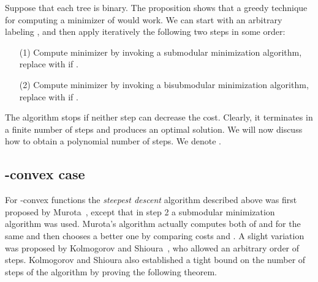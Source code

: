 \documentclass[11pt,onecolumn]{article}
\begin{document}
Suppose that each tree  is binary.
The proposition shows that a greedy technique for computing a minimizer of  would work. We can start with an arbitrary labeling ,
and then apply iteratively the following two steps in some order:
\begin{itemize}
\item[(1)] Compute minimizer  by invoking a submodular minimization algorithm, replace  with  if .
\item[(2)] Compute minimizer  by invoking a bisubmodular minimization algorithm, replace  with  if . 
\end{itemize}
The algorithm stops if neither step can decrease the cost. Clearly, it terminates in a finite number of steps and produces an optimal solution.
We will now discuss how to obtain a polynomial number of steps. We denote .

\subsection{-convex case}
For -convex functions the {\em steepest descent} algorithm described above was first proposed by Murota~\cite{Murota:IEICE00,Murota:book,Murota:SIAM03},
except that in step 2 a submodular minimization algorithm was used.
Murota's algorithm actually computes both of  and  for the same  and then chooses a better one by comparing costs
 and . A slight variation was proposed by Kolmogorov and Shioura~\cite{KS:09}, who allowed an arbitrary order of steps.
Kolmogorov and Shioura also established a tight bound on the number of steps of the algorithm by proving the following theorem.
\end{document}
